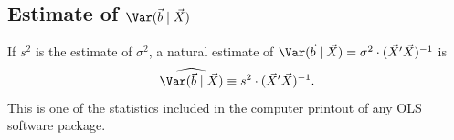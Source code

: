 \subsection*{Estimate of \texorpdfstring{$\Var(\vec{b} \mid \vec{X})$}{Var(b|X)}}

If $s^{2}$ is the estimate of $\sigma^{2}$, a natural estimate of
$\Var(\vec{b} \mid \vec{X}) = \sigma^{2} \cdot (\vec{X}'\vec{X})^{-1}$ is
%
\begin{equation}
  \widehat{\Var(\vec{b} \mid \vec{X})}
    \equiv s^{2} \cdot (\vec{X}'\vec{X})^{-1}.
  \label{eq:1.3.4}
\end{equation}
%
This is one of the statistics included in the computer printout of any OLS software
package.
